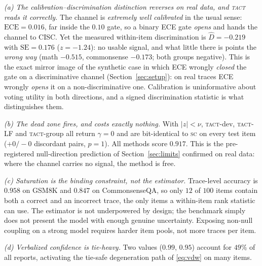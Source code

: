 \documentclass{article}
\newcommand{\Dhat}{\widehat{D}}
\newcommand{\SC}{\textsc{sc}}
\newcommand{\TACT}{\textsc{tact}}
\begin{document}
\emph{(a) The calibration--discrimination distinction reverses on real data,
and \TACT{} reads it correctly.} The channel is \emph{extremely well calibrated}
in the usual sense: $\mathrm{ECE}=0.016$, far inside the $0.10$ gate, so a
binary ECE gate \emph{opens} and hands the channel to CISC. Yet the measured
within-item discrimination is $\Dhat=-0.219$ with $\mathrm{SE}=0.176$
($z=-1.24$): no usable signal, and what little there is points the
\emph{wrong way} (math $-0.515$, commonsense $-0.173$; both groups negative).
This is the exact mirror image of the synthetic case in which ECE wrongly
\emph{closed} the gate on a discriminative channel (Section~\ref{sec:setup}):
on real traces ECE wrongly \emph{opens} it on a non-discriminative one.
Calibration is uninformative about voting utility in both directions, and a
signed discrimination statistic is what distinguishes them.

\emph{(b) The dead zone fires, and costs exactly nothing.} With $|z|<\nu$,
\TACT-dev, \TACT-LF and \TACT-group all return $\gamma=0$ and are bit-identical
to \SC{} on every test item ($+0/-0$ discordant pairs, $p=1$). All methods score
$0.917$. This is the pre-registered null-direction prediction of
Section~\ref{sec:limits} confirmed on real data: where the channel carries no
signal, the method is free.

\emph{(c) Saturation is the binding constraint, not the estimator.} Trace-level
accuracy is $0.958$ on GSM8K and $0.847$ on CommonsenseQA, so only $12$ of $100$
items contain both a correct and an incorrect trace, the only items a
within-item rank statistic can use. The estimator is not underpowered by
design; the benchmark simply does not present the model with enough genuine
uncertainty. Exposing non-null coupling on a strong model requires harder item
pools, not more traces per item.

\emph{(d) Verbalized confidence is tie-heavy.} Two values ($0.99$, $0.95$)
account for $49\%$ of all reports, activating the tie-safe degeneration path of
\eqref{eq:vdw} on many items.
\end{document}
